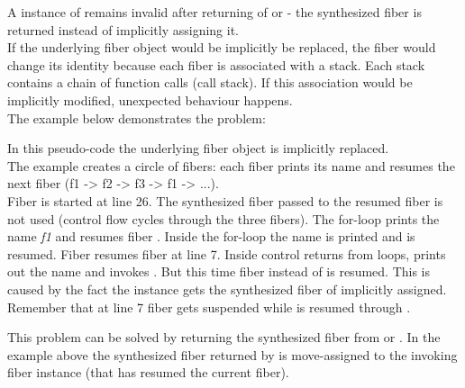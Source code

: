 
\label{fiberreturn}
A instance of \fiber remains invalid after returning of \resume or \resumewith -
the synthesized fiber is returned instead of implicitly assigning it.\\
If the underlying fiber object would be implicitly be replaced, the fiber would 
change its identity because each fiber is associated with a stack. Each stack
contains a chain of function calls (call stack). If this association would be
implicitly modified, unexpected behaviour happens.\\
The example below demonstrates the problem:

In this pseudo-code the underlying fiber object is implicitly replaced.\\
The example creates a circle of fibers: each fiber prints its name and resumes
the next fiber (f1 -> f2 -> f3 -> f1 -> ...).\\
Fiber  is started at line 26. The synthesized fiber  passed 
to the resumed fiber is not used (control flow cycles through the three fibers).
The for-loop prints the name \emph{f1} and resumes fiber . Inside the
for-loop  the name is printed and  is resumed. Fiber 
resumes fiber  at line 7. Inside  control returns from
 loops, prints out the name and invokes . But
this time fiber  instead of  is resumed. This is caused by the
fact the instance  gets the synthesized fiber of  implicitly
assigned. Remember that at line 7 fiber  gets suspended while 
is resumed through .

This problem can be solved by returning the synthesized fiber from  \resume or
\resumewith. In the example above the synthesized fiber returned by \resume is
move-assigned to the invoking fiber instance (that has resumed the current
fiber).\\

\xspace\newline

